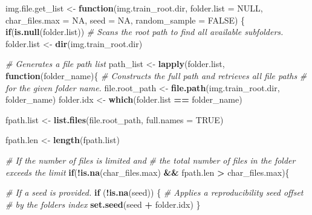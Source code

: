 \documentclass[
]{report}
\newenvironment{Shaded}{\begin{snugshade}}{\end{snugshade}}
\newcommand{\AttributeTok}[1]{\textcolor[rgb]{0.13,0.29,0.53}{#1}}
\newcommand{\CommentTok}[1]{\textcolor[rgb]{0.56,0.35,0.01}{\textit{#1}}}
\newcommand{\ConstantTok}[1]{\textcolor[rgb]{0.56,0.35,0.01}{#1}}
\newcommand{\ControlFlowTok}[1]{\textcolor[rgb]{0.13,0.29,0.53}{\textbf{#1}}}
\newcommand{\FunctionTok}[1]{\textcolor[rgb]{0.13,0.29,0.53}{\textbf{#1}}}
\newcommand{\NormalTok}[1]{#1}
\newcommand{\OtherTok}[1]{\textcolor[rgb]{0.56,0.35,0.01}{#1}}
\newcommand{\SpecialCharTok}[1]{\textcolor[rgb]{0.81,0.36,0.00}{\textbf{#1}}}
\begin{document}
\begin{Shaded}
\begin{Highlighting}[]
\NormalTok{img.file.get\_list }\OtherTok{\textless{}{-}} \ControlFlowTok{function}\NormalTok{(img.train\_root.dir, }
                                   \AttributeTok{folder.list =} \ConstantTok{NULL}\NormalTok{, }
                                   \AttributeTok{char\_files.max =} \ConstantTok{NA}\NormalTok{,}
                                   \AttributeTok{seed =} \ConstantTok{NA}\NormalTok{,}
                                   \AttributeTok{random\_sample =} \ConstantTok{FALSE}\NormalTok{) \{}
  \ControlFlowTok{if}\NormalTok{(}\FunctionTok{is.null}\NormalTok{(folder.list))}
    \CommentTok{\# Scans the root path to find all available subfolders.}
\NormalTok{    folder.list }\OtherTok{\textless{}{-}} \FunctionTok{dir}\NormalTok{(img.train\_root.dir)}

  \CommentTok{\# Generates a file path list}
\NormalTok{  path\_list }\OtherTok{\textless{}{-}} \FunctionTok{lapply}\NormalTok{(folder.list, }\ControlFlowTok{function}\NormalTok{(folder\_name)\{}
    \CommentTok{\#\textquotesingle{} Constructs the full path and retrieves all file paths }
    \CommentTok{\#\textquotesingle{} for the given folder name.}
\NormalTok{    file.root\_path }\OtherTok{\textless{}{-}} \FunctionTok{file.path}\NormalTok{(img.train\_root.dir, folder\_name)}
\NormalTok{    folder.idx }\OtherTok{\textless{}{-}} \FunctionTok{which}\NormalTok{(folder.list }\SpecialCharTok{==}\NormalTok{ folder\_name)}
    
\NormalTok{    fpath.list }\OtherTok{\textless{}{-}} \FunctionTok{list.files}\NormalTok{(file.root\_path, }
                             \AttributeTok{full.names =} \ConstantTok{TRUE}\NormalTok{)}
    
\NormalTok{    fpath.len }\OtherTok{\textless{}{-}} \FunctionTok{length}\NormalTok{(fpath.list)}

    \CommentTok{\# If the number of files is limited and }
    \CommentTok{\# the total number of files in the folder exceeds the limit}
    \ControlFlowTok{if}\NormalTok{(}\SpecialCharTok{!}\FunctionTok{is.na}\NormalTok{(char\_files.max) }\SpecialCharTok{\&\&}\NormalTok{ fpath.len }\SpecialCharTok{\textgreater{}}\NormalTok{ char\_files.max)\{}
      
      \CommentTok{\# If a seed is provided.}
      \ControlFlowTok{if}\NormalTok{ (}\SpecialCharTok{!}\FunctionTok{is.na}\NormalTok{(seed)) \{}
        \CommentTok{\#\textquotesingle{} Applies a reproducibility seed offset }
        \CommentTok{\#\textquotesingle{} by the folder\textquotesingle{}s index}
        \FunctionTok{set.seed}\NormalTok{(seed }\SpecialCharTok{+}\NormalTok{ folder.idx)}
\NormalTok{      \}}
      

\end{Highlighting}
\end{Shaded}
\end{document}
